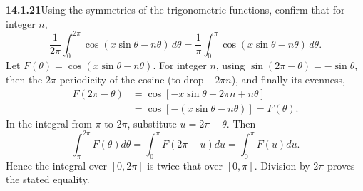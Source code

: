 \par\bigskip
\noindent\textbf{14.1.21}\quad Using the symmetries of the trigonometric
functions, confirm that for integer $n$,
\[
\frac{1}{2\pi}\int_{0}^{2\pi}\cos(x\sin\theta-n\theta)\,d\theta
=\frac{1}{\pi}\int_{0}^{\pi}\cos(x\sin\theta-n\theta)\,d\theta.
\]
\solution
Let $F(\theta)=\cos(x\sin\theta-n\theta)$. For integer $n$, using
$\sin(2\pi-\theta)=-\sin\theta$, then the $2\pi$ periodicity of the
cosine (to drop $-2\pi n$), and finally its evenness,
\begin{align*}
F(2\pi-\theta)
&=\cos[-x\sin\theta-2\pi n+n\theta]\\
&=\cos[-(x\sin\theta-n\theta)]=F(\theta).
\end{align*}
In the integral from $\pi$ to $2\pi$, substitute $u=2\pi-\theta$.
Then
\[
\int_\pi^{2\pi}F(\theta)d\theta
=\int_0^\pi F(2\pi-u)du=\int_0^\pi F(u)du.
\]
Hence the integral over $[0,2\pi]$ is twice that over $[0,\pi]$.
Division by $2\pi$ proves the stated equality.

